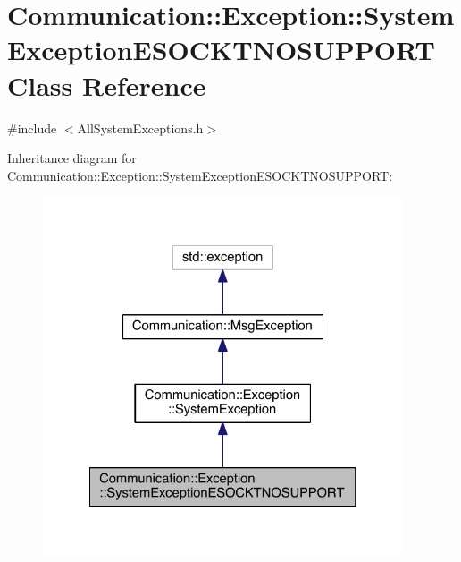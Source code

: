 \hypertarget{class_communication_1_1_exception_1_1_system_exception_e_s_o_c_k_t_n_o_s_u_p_p_o_r_t}{}\section{Communication\+:\+:Exception\+:\+:System\+Exception\+E\+S\+O\+C\+K\+T\+N\+O\+S\+U\+P\+P\+O\+R\+T Class Reference}
\label{class_communication_1_1_exception_1_1_system_exception_e_s_o_c_k_t_n_o_s_u_p_p_o_r_t}


{\ttfamily \#include $<$All\+System\+Exceptions.\+h$>$}



Inheritance diagram for Communication\+:\+:Exception\+:\+:System\+Exception\+E\+S\+O\+C\+K\+T\+N\+O\+S\+U\+P\+P\+O\+R\+T\+:\nopagebreak
\begin{figure}[H]
\begin{center}
\leavevmode
\includegraphics[width=302pt]{class_communication_1_1_exception_1_1_system_exception_e_s_o_c_k_t_n_o_s_u_p_p_o_r_t__inherit__graph}
\end{center}
\end{figure}


